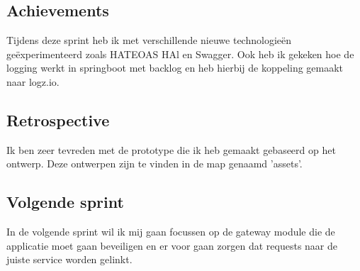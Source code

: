 \documentclass[11pt, twoside]{report}
\begin{document}
    \subsection{Achievements}\label{subsec:achievements-1}
    Tijdens deze sprint heb ik met verschillende nieuwe technologieën geëxperimenteerd zoals HATEOAS HAl en Swagger.
    Ook heb ik gekeken hoe de logging werkt in springboot met backlog en heb hierbij de koppeling gemaakt naar logz.io.

    \subsection{Retrospective}\label{subsec:retrospective-1}
    Ik ben zeer tevreden met de prototype die ik heb gemaakt gebaseerd op het ontwerp.
    Deze ontwerpen zijn te vinden in de map genaamd 'assets'.

    \subsection{Volgende sprint}\label{subsec:volgende-sprint-1}
    In de volgende sprint wil ik mij gaan focussen op de gateway module die de applicatie moet gaan beveiligen en er
    voor gaan zorgen dat requests naar de juiste service worden gelinkt.
\end{document}
